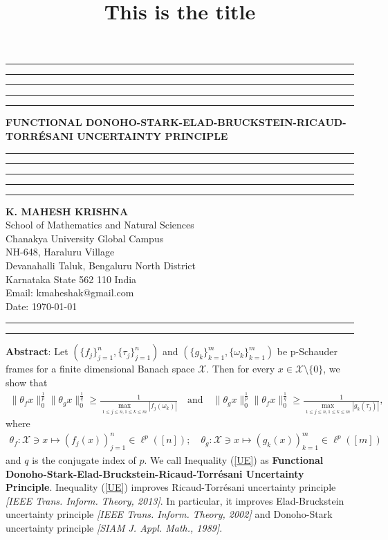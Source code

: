 \documentclass{amsart}
\title{This is the title}
\begin{document}
\hrule\hrule\hrule\hrule\hrule
\vspace{0.3cm}	
\begin{center}
{\bf{FUNCTIONAL DONOHO-STARK-ELAD-BRUCKSTEIN-RICAUD-TORR\'{E}SANI UNCERTAINTY PRINCIPLE}}\\
\vspace{0.3cm}
\hrule\hrule\hrule\hrule\hrule
\vspace{0.3cm}
\textbf{K. MAHESH KRISHNA}\\
School of Mathematics and Natural Sciences\\
Chanakya University Global Campus\\
NH-648, Haraluru Village\\
Devanahalli Taluk, 	Bengaluru  North District\\
Karnataka State 562 110 India \\
Email: kmaheshak@gmail.com\\

Date: \today
\end{center}

\hrule\hrule
\vspace{0.5cm}
\textbf{Abstract}: Let $(\{f_j\}_{j=1}^n, \{\tau_j\}_{j=1}^n)$ and $(\{g_k\}_{k=1}^m, \{\omega_k\}_{k=1}^m)$ be  p-Schauder frames  for a finite dimensional Banach space $\mathcal{X}$. Then for every $x \in \mathcal{X}\setminus\{0\}$,  we show that 
\begin{align}\label{UE}
	\|\theta_f x\|_0^\frac{1}{p}\|\theta_g x\|_0^\frac{1}{q} \geq 	\frac{1}{\displaystyle\max_{1\leq j\leq n, 1\leq k\leq m}|f_j(\omega_k)|}\quad \text{and} 	\quad \|\theta_g x\|_0^\frac{1}{p}\|\theta_f x\|_0^\frac{1}{q}\geq \frac{1}{\displaystyle\max_{1\leq j\leq n, 1\leq k\leq m}|g_k(\tau_j)|},
\end{align}
where 
\begin{align*}
\theta_f: \mathcal{X} \ni x \mapsto (f_j(x) )_{j=1}^n \in \ell^p([n]); \quad \theta_g: \mathcal{X} \ni x \mapsto (g_k(x) )_{k=1}^m \in \ell^p([m])	
\end{align*}
and $q$ is the conjugate index of $p$. We call Inequality (\ref{UE}) as \textbf{Functional Donoho-Stark-Elad-Bruckstein-Ricaud-Torr\'{e}sani Uncertainty Principle}. Inequality (\ref{UE}) improves Ricaud-Torr\'{e}sani uncertainty principle \textit{[IEEE Trans. Inform. Theory, 2013]}. In particular, it improves  Elad-Bruckstein uncertainty principle \textit{[IEEE Trans. Inform. Theory, 2002]} and Donoho-Stark uncertainty principle \textit{[SIAM J. Appl. Math., 1989]}. 
\end{document}
